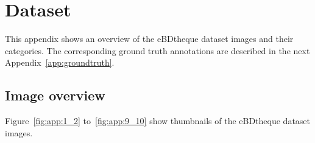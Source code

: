 \chapter{Dataset}
\label{app:dataset}
\graphicspath{{./chapters/Appendix/figs/}}

This appendix shows an overview of the eBDtheque dataset images and their categories.
The corresponding ground truth annotations are described in the next Appendix~\ref{app:groundtruth}.

\section{Image overview} %
\label{sec:image_overview}

Figure~\ref{fig:app:1_2} to~\ref{fig:app:9_10} show thumbnails of the eBDtheque dataset images.

